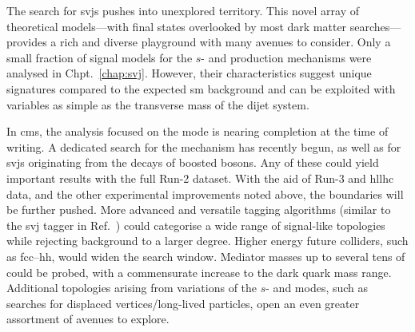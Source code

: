 The search for \glspl{svj} pushes into unexplored territory. This novel array of theoretical models---with final states overlooked by most dark matter searches---provides a rich and diverse playground with many avenues to consider. Only a small fraction of signal models for the $s$- and \tchannel production mechanisms were analysed in Chpt.~\ref{chap:svj}. However, their characteristics suggest unique signatures compared to the expected \acrlong{sm} background and can be exploited with variables as simple as the transverse mass of the dijet system.

In \acrshort{cms}, the analysis focused on the \schannel mode is nearing completion at the time of writing. A dedicated search for the \tchannel mechanism has recently begun, as well as for \glspl{svj} originating from the decays of boosted \PZprime bosons. Any of these could yield important results with the full Run-2 dataset. With the aid of Run-3 and \acrshort{hllhc} data, and the other experimental improvements noted above, the boundaries will be further pushed. More advanced and versatile tagging algorithms (similar to the \gls{svj} tagger in Ref.~\citenumNegSpace) could categorise a wide range of signal-like topologies while rejecting background to a larger degree. Higher energy future colliders, such as \acrshort{fcc}--hh, would widen the search window. Mediator masses up to several tens of \TeVns could be probed, with a commensurate increase to the dark quark mass range. Additional topologies arising from variations of the $s$- and \tchannel modes, such as searches for displaced vertices/long-lived particles, open an even greater assortment of avenues to explore.
